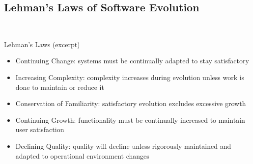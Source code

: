 \subsection{Lehman's Laws of Software Evolution}
\begin{frame}{\insertsubsection\ }
	\begin{fancycolumns}
		\begin{definition}{Lehman's Laws (excerpt)}
			\begin{itemize}
				\item Continuing Change: systems must be continually adapted to stay satisfactory %
				\item Increasing Complexity: complexity increases during evolution unless work is done to maintain or reduce it %
				\item Conservation of Familiarity: satisfactory evolution excludes excessive growth %
				\item Continuing Growth: functionality must be continually increased to maintain user satisfaction %
				\item Declining Quality: quality will decline unless rigorously maintained and adapted to operational environment changes %

\end{itemize}
\end{definition}
\end{fancycolumns}
\end{frame}
